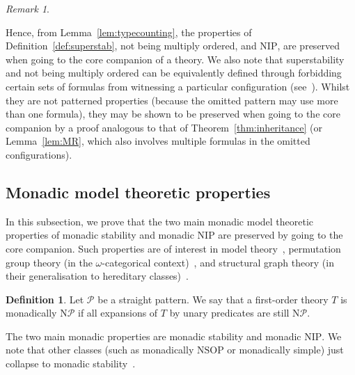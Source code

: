\documentclass{amsart}
\theoremstyle{definition}
\newtheorem{definition}[theorem]{Definition}
\theoremstyle{remark}
\newtheorem{remark}[theorem]{Remark}
\numberwithin{equation}{section}
\begin{document}
\begin{remark}
\begin{itemize}
\end{itemize}
Hence, from Lemma~\ref{lem:typecounting}, the properties of Definition~\ref{def:superstab}, not being multiply ordered, and $\mathrm{NIP}$, are preserved when going to the core companion  of a theory. We also note that superstability and not being multiply ordered can be equivalently defined through forbidding certain sets of formulas from witnessing a particular configuration (see~\cite{keisler1976six, shelah1971stability}). Whilst they are not patterned properties (because the omitted pattern may use more than one formula), they may be shown to be preserved when going to the core companion  by a proof analogous to that of Theorem~\ref{thm:inheritance} (or Lemma~\ref{lem:MR}, which also involves multiple formulas in the omitted configurations).
\end{remark}





\subsection{Monadic model theoretic properties}\label{sub:monadic}
In this subsection, we prove that the two main monadic model theoretic properties of monadic stability and monadic $\mathrm{NIP}$ are preserved by going to the core companion. Such properties are of interest in model theory~\cite{baldwin1985second}, permutation group theory (in the $\omega$-categorical context)~\cite{braunfeld2022monadic, bodor2024classification}, and structural graph theory (in their generalisation to hereditary classes)~\cite{dreier2024first}.



\begin{definition}\label{def:monadicNIP} Let $\mathcal{P}$ be a straight pattern. We say that a first-order theory $T$ is monadically $\mathrm{N}\mathcal{P}$ if all expansions of %
$T$ by unary predicates are still $\mathrm{N}\mathcal{P}$.  
\end{definition}

	The two main monadic properties are monadic stability and monadic $\mathrm{NIP}$. We note that other classes (such as monadically $\mathrm{NSOP}$ or monadically simple) just collapse to monadic stability~\cite{monadicallyNSOP}. 
\end{document}

